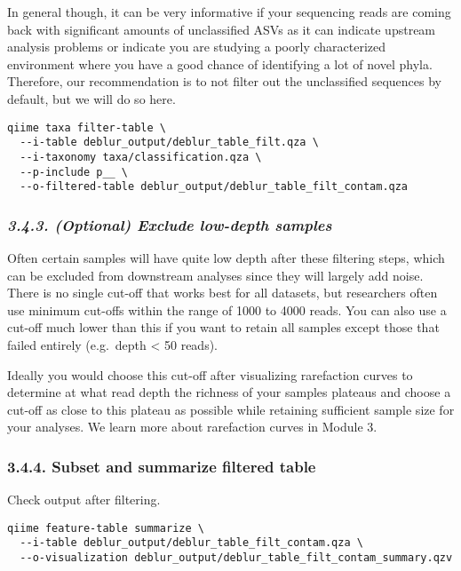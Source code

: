 \documentclass[
]{book}
\begin{document}
In general though, it can be very informative if your sequencing reads are coming back with significant amounts of unclassified ASVs as it can indicate upstream analysis problems or indicate you are studying a poorly characterized environment where you have a good chance of identifying a lot of novel phyla. Therefore, our recommendation is to not filter out the unclassified sequences by default, but we will do so here.

\begin{verbatim}
qiime taxa filter-table \
  --i-table deblur_output/deblur_table_filt.qza \
  --i-taxonomy taxa/classification.qza \
  --p-include p__ \
  --o-filtered-table deblur_output/deblur_table_filt_contam.qza
\end{verbatim}

\subsubsection{\texorpdfstring{\emph{3.4.3. (Optional) Exclude low-depth samples}}{3.4.3. (Optional) Exclude low-depth samples}}\label{optional-exclude-low-depth-samples-2}

Often certain samples will have quite low depth after these filtering steps, which can be excluded from downstream analyses since they will largely add noise. There is no single cut-off that works best for all datasets, but researchers often use minimum cut-offs within the range of 1000 to 4000 reads. You can also use a cut-off much lower than this if you want to retain all samples except those that failed entirely (e.g.~depth \textless{} 50 reads).

Ideally you would choose this cut-off after visualizing rarefaction curves to determine at what read depth the richness of your samples plateaus and choose a cut-off as close to this plateau as possible while retaining sufficient sample size for your analyses. We learn more about rarefaction curves in Module 3.

\subsubsection{3.4.4. Subset and summarize filtered table}\label{subset-and-summarize-filtered-table-2}

Check output after filtering.

\begin{verbatim}
qiime feature-table summarize \
  --i-table deblur_output/deblur_table_filt_contam.qza \
  --o-visualization deblur_output/deblur_table_filt_contam_summary.qzv
\end{verbatim}
\end{document}
